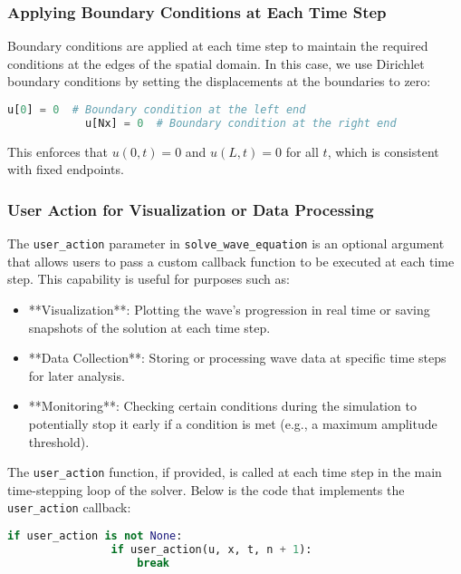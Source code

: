 \documentclass{article}
\begin{document}
		\subsubsection{Applying Boundary Conditions at Each Time Step}
		
		Boundary conditions are applied at each time step to maintain the required conditions at the edges of the spatial domain. In this case, we use Dirichlet boundary conditions by setting the displacements at the boundaries to zero:
		
		\begin{lstlisting}[language=Python, caption=Applying Boundary Conditions]
			u[0] = 0  # Boundary condition at the left end
			u[Nx] = 0  # Boundary condition at the right end
		\end{lstlisting}
		
		This enforces that $u(0, t) = 0$ and $u(L, t) = 0$ for all $t$, which is consistent with fixed endpoints.
		
		\subsubsection{User Action for Visualization or Data Processing}
		
		The \texttt{user\_action} parameter in \texttt{solve\_wave\_equation} is an optional argument that allows users to pass a custom callback function to be executed at each time step. This capability is useful for purposes such as:
		\begin{itemize}
			\item **Visualization**: Plotting the wave's progression in real time or saving snapshots of the solution at each time step.
			\item **Data Collection**: Storing or processing wave data at specific time steps for later analysis.
			\item **Monitoring**: Checking certain conditions during the simulation to potentially stop it early if a condition is met (e.g., a maximum amplitude threshold).
		\end{itemize}
		
		The \texttt{user\_action} function, if provided, is called at each time step in the main time-stepping loop of the solver. Below is the code that implements the \texttt{user\_action} callback:
		
		\begin{lstlisting}[language=Python, caption=User Action Callback]
			if user_action is not None:
				if user_action(u, x, t, n + 1):
					break
		\end{lstlisting}
		
\end{document}

